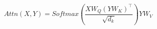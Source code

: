 \begin{equation}
\label{eq:attention}
Attn(X,Y)=Softmax\left( \frac{X{W}_{Q}{\left( Y{W}_{K}\right) }^{\top }}{\sqrt{{d}_{k}}}\right) Y{W}_{V}
\end{equation}
